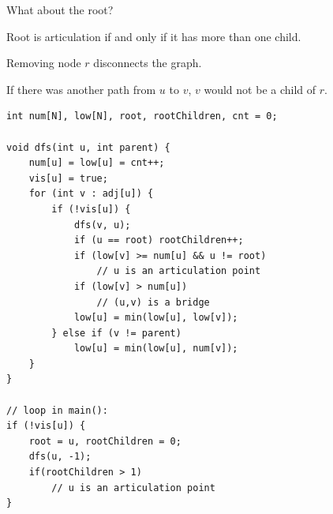 \documentclass[10pt]{beamer}
\begin{document}
\begin{frame}

What about the root? \pause 

\vspace{0.5cm}

Root is articulation if and only if it has more than one child.

\vspace{0.5cm}

\begin{center}
\end{center}

\vspace{0.5cm}

Removing node $r$ disconnects the graph.

\vspace{0.5cm}

If there was another path from $u$ to $v$, $v$ would not be a child of $r$.

\end{frame}


\begin{frame}[fragile]

\begin{lstlisting}
int num[N], low[N], root, rootChildren, cnt = 0;

void dfs(int u, int parent) {
    num[u] = low[u] = cnt++;
    vis[u] = true;
    for (int v : adj[u]) {
        if (!vis[u]) {
            dfs(v, u);
            if (u == root) rootChildren++;
            if (low[v] >= num[u] && u != root)
                // u is an articulation point
            if (low[v] > num[u])
                // (u,v) is a bridge
            low[u] = min(low[u], low[v]);
        } else if (v != parent)
            low[u] = min(low[u], num[v]);
    }
}

// loop in main():
if (!vis[u]) {
    root = u, rootChildren = 0;
    dfs(u, -1);
    if(rootChildren > 1)
        // u is an articulation point
}
\end{lstlisting}

\end{frame}
\end{document}

